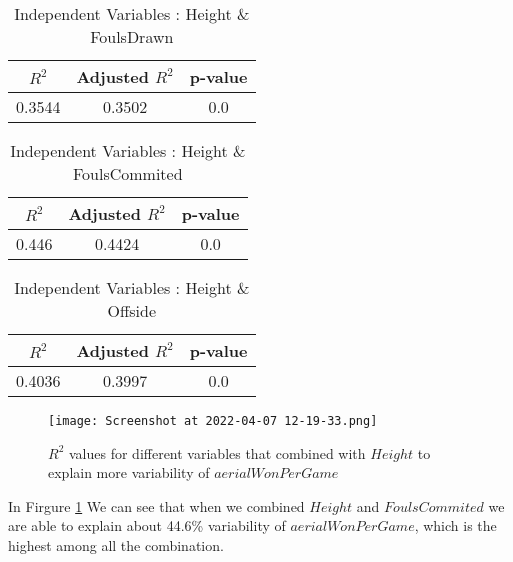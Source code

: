 \documentclass[12pt]{article}
\begin{document}
\hfill
\begin{minipage}{0.4\textwidth}
	\begin{table}[H]
		\centering
		\caption{Independent Variables : Height \& FoulsDrawn}\label{table:1a}
		{\begin{tabular}{|c|c|c|}
				\hline
				$ R^2 $ & Adjusted $ R^2 $ & p-value \\
				\hline
				0.3544 & 0.3502 & 0.0 \\
				\hline
			\end{tabular}
		}
	\end{table}
\end{minipage}
\hfill
\begin{minipage}{0.4\textwidth}
	\begin{table}[H]
		\centering
		\caption{Independent Variables : Height \& FoulsCommited}\label{table:1a}
		{\begin{tabular}{|c|c|c|}
				\hline
				$ R^2 $ & Adjusted $ R^2 $ & p-value \\
				\hline
				0.446 & 0.4424 & 0.0 \\
				\hline
			\end{tabular}
		}
	\end{table}
\end{minipage}
\hfill
\begin{minipage}{0.4\textwidth}
	\begin{table}[H]
		\centering
		\caption{Independent Variables : Height \& Offside}\label{table:1a}
		{\begin{tabular}{|c|c|c|}
				\hline
				$ R^2 $ & Adjusted $ R^2 $ & p-value \\
				\hline
				0.4036 & 0.3997 & 0.0 \\
				\hline
			\end{tabular}
		}
	\end{table}
\end{minipage}

\begin{figure}[H]
	\centering
	\texttt{[image: Screenshot at 2022-04-07 12-19-33.png]}
	\caption{ $ R^2 $ values for different variables that combined with $ Height $ to explain more variability of $ aerialWonPerGame $}
	\label{fig:1}
	\label{var2AWPG}
\end{figure} 

In Firgure \ref{var2AWPG} We can see that when we combined $ Height $ and $ FoulsCommited $ we are able to explain about 44.6\% variability of $ aerialWonPerGame $, which is the highest among all the combination.
\end{document}
